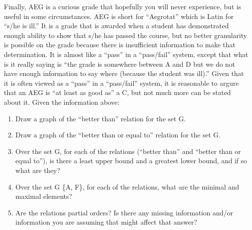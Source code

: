 \documentclass[12pt]{article}
\newenvironment{problem}[2][Problem]{\begin{trivlist}
\item[\hskip \labelsep {\bfseries #1}\hskip \labelsep {\bfseries #2.}]}{\end{trivlist}}
\begin{document}
\begin{problem}{7}
Finally, AEG is a curious grade that hopefully you will never experience, but is useful in some circumstances. AEG is short for “Aegrotat” which is Latin for “s/he is ill.” It is a grade that is awarded when a student has demonstrated enough ability to show that s/he has passed the course, but no better granularity is possible on the grade because there is insufficient information to make that determination. It is almost like a “pass” in a “pass/fail” system, except that what is it really saying is “the grade is somewhere between A and D but we do not have enough information to say where (because the student was ill).” Given that it is often viewed as a “pass” in a “pass/fail” system, it is reasonable to argure that an AEG is “at least as good as” a C, but not much more can be stated about it.
Given the information above:
\item[]
\begin{enumerate}[label=\alph*)]
    \item Draw a graph of the “better than” relation for the set G.
    \item Draw a graph of the “better than or equal to” relation for the set G.
    \item Over the set G, for each of the relations (“better than” and “better than or equal to”), is there a least upper bound and a greatest lower bound, and if so what are they?
    \item Over the set G \textminus  \{A, F\}, for each of the relations, what are the minimal and maximal elements?
    \item Are the relations partial orders? Is there any missing information and/or information you are assuming that might affect that answer?
\end{enumerate}
\end{problem}
\end{document}
